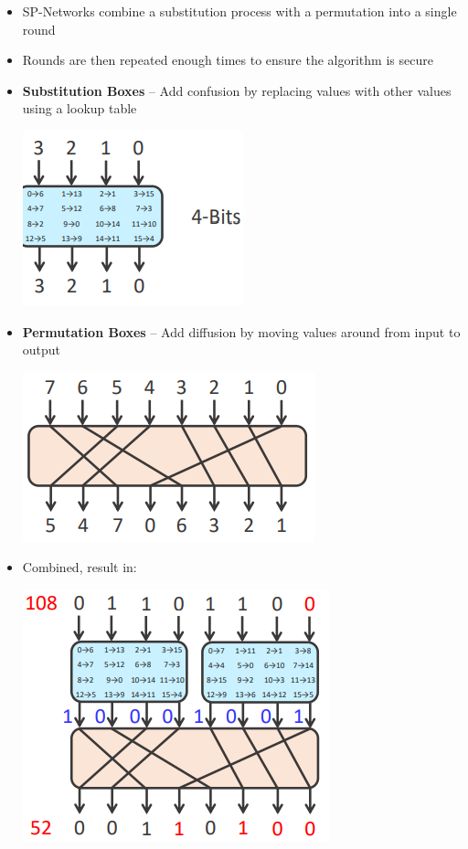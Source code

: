 \documentclass{article}
\begin{document}
\begin{itemize} 
  \item SP-Networks combine a substitution process with a permutation into a single round 
  \item Rounds are then repeated enough times to ensure the algorithm is secure
  \item \textbf{Substitution Boxes} – Add confusion by replacing values with other values using a lookup table
  \begin{center}
    \includegraphics[scale=0.5]{subst_box.png}
  \end{center}
  \item \textbf{Permutation Boxes} – Add diffusion by moving values around from input to output
  \begin{center}
    \includegraphics[scale=0.5]{perm_box.png}
  \end{center}
  \item Combined, result in:
  \begin{center}
    \includegraphics[scale=0.5]{sp_box.png}
  \end{center}
\end{itemize}
\end{document}
